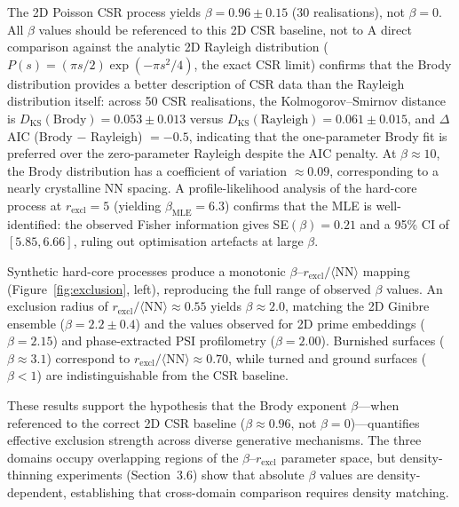 \documentclass[final,1p,times]{elsarticle}
\theoremstyle{definition}
\begin{document}
The 2D Poisson CSR process yields $\beta = 0.96 \pm 0.15$
(30 realisations), not $\beta = 0$. All $\beta$
values should be referenced to this 2D CSR baseline, not to
A direct comparison against the analytic 2D Rayleigh distribution
($P(s) = (\pi s/2)\exp(-\pi s^2/4)$, the exact CSR limit) confirms
that the Brody distribution provides a better description of CSR
data than the Rayleigh distribution itself: across 50 CSR
realisations, the Kolmogorov--Smirnov distance is
$D_{\text{KS}}(\text{Brody}) = 0.053 \pm 0.013$ versus
$D_{\text{KS}}(\text{Rayleigh}) = 0.061 \pm 0.015$, and $\Delta$AIC
(Brody $-$ Rayleigh) $= -0.5$, indicating that the one-parameter Brody
fit is preferred over the zero-parameter Rayleigh despite the AIC
penalty. At $\beta \approx 10$, the Brody distribution has a
coefficient of variation $\approx 0.09$, corresponding to a nearly
crystalline NN spacing. A profile-likelihood analysis of the
hard-core process at $r_{\text{excl}} = 5$ (yielding $\beta_{\text{MLE}}
= 6.3$) confirms that the MLE is well-identified: the observed Fisher
information gives SE$(\beta) = 0.21$ and a 95\% CI of $[5.85, 6.66]$,
ruling out optimisation artefacts at large $\beta$.

Synthetic hard-core processes produce a monotonic
$\beta$--$r_{\text{excl}}/\langle\text{NN}\rangle$ mapping
(Figure~\ref{fig:exclusion}, left), reproducing the full range of
observed $\beta$ values. An exclusion radius of
$r_{\text{excl}}/\langle\text{NN}\rangle \approx 0.55$ yields
$\beta \approx 2.0$, matching the 2D Ginibre ensemble
($\beta = 2.2 \pm 0.4$) and the values observed for 2D prime
embeddings ($\beta = 2.15$) and phase-extracted PSI
profilometry ($\beta = 2.00$). Burnished surfaces
($\beta \approx 3.1$) correspond to
$r_{\text{excl}}/\langle\text{NN}\rangle \approx 0.70$, while
turned and ground surfaces ($\beta < 1$) are
indistinguishable from the CSR baseline.

These results support the hypothesis that the Brody exponent
$\beta$---when referenced to the correct 2D CSR baseline
($\beta \approx 0.96$, not $\beta = 0$)---quantifies effective
exclusion strength across diverse generative mechanisms.
The three domains occupy overlapping regions of the
$\beta$--$r_{\text{excl}}$ parameter space, but
density-thinning experiments (Section~3.6) show that absolute
$\beta$ values are density-dependent, establishing that
cross-domain comparison requires density matching.
\end{document}
